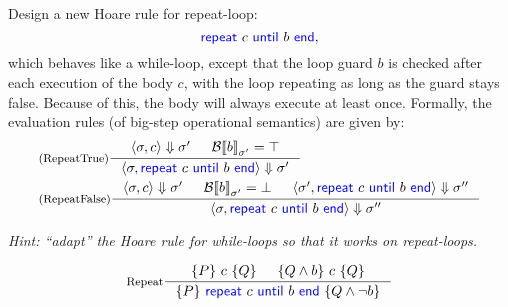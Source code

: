 \documentclass[11pt,a4paper]{article}
\newcommand{\pair}[1]{\langle #1 \rangle}
\newcommand{\evalB}[2]{{\mathcal{B}\llbracket #1 \rrbracket}_{#2}}
\newcommand{\evalC}[3]{\pair{#1, #2} \Downarrow #3}
\newcommand{\kword}[1]{{\color{blue} \textsf{#1}}}
\newcommand{\End}{\kword{end}}
\newcommand{\Repeat}{\kword{repeat}}
\newcommand{\Until}{\kword{until}}
\begin{document}
\subproblem Design a new Hoare rule for repeat-loop:
$$\Repeat~c~\Until~b~\End,$$
which behaves like a while-loop, except that the loop guard $b$ is checked after each execution of the body $c$,
with the loop repeating as long as the guard stays false.
Because of this, the body will always execute at least once.
Formally, the evaluation rules (of big-step operational semantics) are given by:
\begin{align*}
	&\inference[(RepeatTrue)]{\evalC{\sigma}{c}{\sigma'} & \evalB{b}{\sigma'}=\top}
		{\evalC{\sigma}{\Repeat~c~\Until~b~\End}{\sigma'}} \\
	&\inference[(RepeatFalse)]{\evalC{\sigma}{c}{\sigma'} & \evalB{b}{\sigma'}=\bot &
		\evalC{\sigma'}{\Repeat~c~\Until~b~\End}{\sigma''}}
		{\evalC{\sigma}{\Repeat~c~\Until~b~\End}{\sigma''}}
\end{align*}

\emph{Hint: ``adapt'' the Hoare rule for while-loops so that it works on repeat-loops.}

\begin{solution}
  $$\inference[Repeat]{\{P\}~c~\{Q\} & \{Q \land b\}~c~\{Q\}}{\{P\}~\Repeat~c~\Until~b~\End~\{Q \land \lnot b\}}$$
\end{solution}

\end{document}

